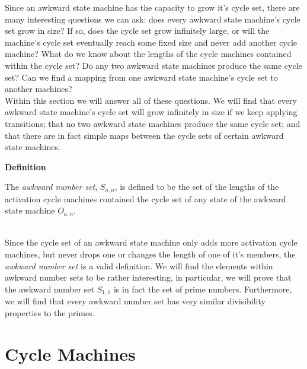 \documentclass[a4paper,12pt]{article}
\begin{document}
\noindent Since an awkward state machine has the capacity to grow it's cycle set, there are many interesting questions we can ask: does every awkward state machine's cycle set grow in size? If so, does the cycle set grow infinitely large, or will the machine's cycle set eventually reach some fixed size and never add another cycle machine? What do we know about the lengths of the cycle machines contained within the cycle set? Do any two awkward state machines produce the same cycle set? Can we find a mapping from one awkward state machine's cycle set to another machines?\\


\noindent Within this section we will answer all of these questions. We will find that every awkward state machine's cycle set will grow infinitely in size if we keep applying transitions; that no two awkward state machines produce the same cycle set; and that there are in fact simple maps between the cycle sets of certain awkward state machines.\\



\label{definition:awkward_number_set}
\hypertarget{definition:awkward_number_set}{}
\begin{tcolorbox}
\textbf{Definition}

\noindent The \textit{awkward number set}, $S_{a, n}$, is defined to be the set of the lengths of the activation cycle machines contained the cycle set of any state of the awkward state machine $O_{a, n}$.
\end{tcolorbox}

\noindent \\ Since the cycle set of an awkward state machine only adds more activation cycle machines, but never drops one or changes the length of one of it's members, the \textit{awkward number set} is a valid definition. We will find the elements within awkward number sets to be rather interesting, in particular, we will prove that the awkward number set $S_{1, 1}$ is in fact the set of prime numbers. Furthermore, we will find that every awkward number set has very similar divisibility properties to the primes.

















\section{Cycle Machines}
\label{section:cycle_machines}
\end{document}
